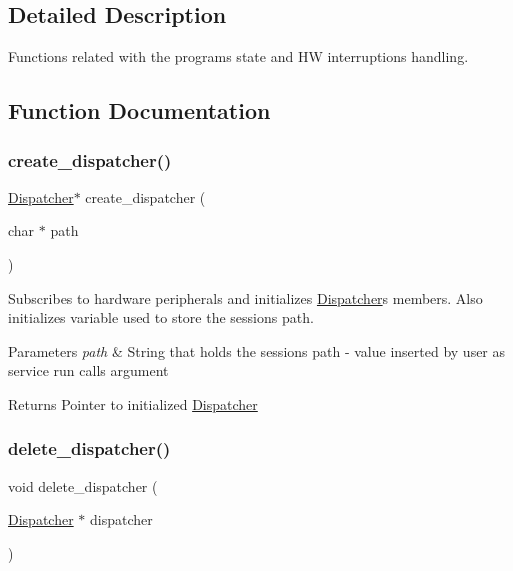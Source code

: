 \subsection{Detailed Description}
Functions related with the program\textquotesingle{}s state and HW interruptions handling. 



\subsection{Function Documentation}
\hypertarget{group__dispatcher_ga806e2b40b340c9431427c77f94e859fa}{}\label{group__dispatcher_ga806e2b40b340c9431427c77f94e859fa} 
\subsubsection{\texorpdfstring{create\+\_\+dispatcher()}{create\_dispatcher()}}
{\footnotesize\ttfamily \hyperlink{struct_dispatcher}{Dispatcher}$\ast$ create\+\_\+dispatcher (\begin{DoxyParamCaption}\item[{char $\ast$}]{path }\end{DoxyParamCaption})}



Subscribes to hardware peripherals and initializes \hyperlink{struct_dispatcher}{Dispatcher}\textquotesingle{}s members. Also initializes variable used to store the session\textquotesingle{}s path. 


\begin{DoxyParams}{Parameters}
{\em path} & String that holds the session\textquotesingle{}s path -\/ value inserted by user as service run call\textquotesingle{}s argument \\
\hline
\end{DoxyParams}
\begin{DoxyReturn}{Returns}
Pointer to initialized \hyperlink{struct_dispatcher}{Dispatcher} 
\end{DoxyReturn}
\hypertarget{group__dispatcher_ga4a58ba5ba48cbbaa0aad022b75685942}{}\label{group__dispatcher_ga4a58ba5ba48cbbaa0aad022b75685942} 
\subsubsection{\texorpdfstring{delete\+\_\+dispatcher()}{delete\_dispatcher()}}
{\footnotesize\ttfamily void delete\+\_\+dispatcher (\begin{DoxyParamCaption}\item[{\hyperlink{struct_dispatcher}{Dispatcher} $\ast$}]{dispatcher }\end{DoxyParamCaption})}



